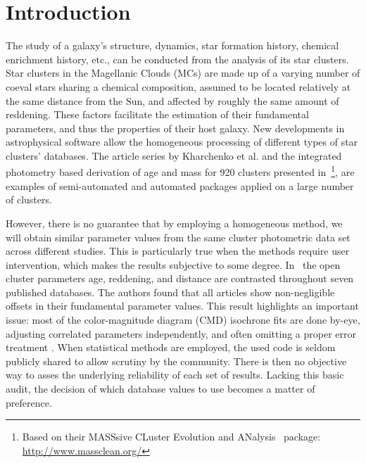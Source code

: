 \documentclass{aa}
\begin{document}

\maketitle
%

\section{Introduction}
\label{sec:intro}

The study of a galaxy's structure, dynamics, star formation history, chemical
enrichment history, etc., can be conducted from the analysis of its star
clusters.
Star clusters in the Magellanic Clouds (MCs) are made up of a varying number of
coeval stars sharing a chemical composition, assumed to be located
relatively at the same distance from the Sun, and affected by roughly the same
amount of reddening. These factors facilitate the estimation of
their fundamental parameters, and thus the properties of their host galaxy.
%
New developments in astrophysical software allow the homogeneous
processing of different types of star clusters' databases. The article series
by Kharchenko et al. 
\citep[see][and references therein]{Kharchenko_2005,Schmeja_2014}
and the integrated photometry based derivation of age and mass for 920 clusters
presented
in~\cite{Popescu_2012}\footnote{Based on their MASSsive CLuster Evolution and
ANalysis~\citep[MASSCLEAN,][]{Popescu_2009} package:
\url{http://www.massclean.org/}}, are examples of semi-automated and automated
packages applied on a large number of clusters.

However, there is no guarantee that by employing a homogeneous method, we will
obtain similar parameter values from the same cluster photometric
data set across different studies. This is particularly true when the methods
require user intervention, which makes the results subjective to some degree.
%
In~\cite{Netopil_2015} the open cluster parameters age, reddening, and distance
are contrasted throughout seven published databases. The authors found that all
articles show non-negligible offsets in their fundamental parameter values.
%
This result highlights an important issue: most of the color-magnitude diagram 
(CMD) isochrone fits are done by-eye, adjusting correlated parameters
independently, and often omitting a proper error treatment \citep[see]
[for a more detailed description of this problem]{vonHippel_2014}.
%
When statistical methods are employed, the used code is seldom publicly
shared to allow scrutiny by the community. There is then no objective way to
asses the underlying reliability of each set of results.
Lacking this basic audit, the decision of which database values to use
becomes a matter of preference.
\end{document}
